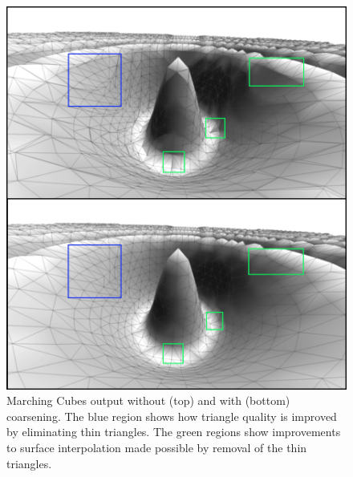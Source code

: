 \documentclass[10pt,journal,cspaper,compsoc]{IEEEtran}
\begin{document}
\begin{figure}[htb]
\includegraphics[width=\columnwidth]{Coarsening.jpg}
\caption{Marching Cubes output without (top) and with (bottom) coarsening.
  The blue region shows how triangle quality is improved by eliminating
  thin triangles. The green regions show improvements to surface
  interpolation made possible by removal of the thin triangles.}

\label{fig:coarsening}
\end{figure}
\end{document}
